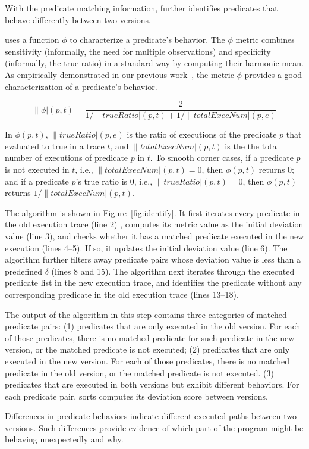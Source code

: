 With the predicate matching information, \ourtool further
identifies predicates that behave differently
between two versions. 

\ourtool uses a function $\phi$ to characterize a predicate's behavior.
The $\phi$ metric combines sensitivity (informally, the need
for multiple observations) and specificity (informally, the
true ratio) in a standard way by computing their harmonic mean.
As empirically demonstrated in our previous work~\cite{Zhang:2013:ADS},
the metric $\phi$ provides a good characterization of a predicate's behavior.

\vspace{-1mm}

{\small{
\[
\|\phi|(p, t) = \frac{2}{{1}/{\|trueRatio|(p, t)} + {1}/{\|totalExecNum|(p, e)}}
\]
}}

\vspace{-1mm}

In $\phi(p, t)$, $\|trueRatio|(p, e)$ is the ratio of executions of the
predicate $p$ that evaluated to true in a trace $t$,
and $\|totalExecNum|(p, t)$ is the the total
number of executions of predicate $p$ in $t$.
To smooth corner cases, if a predicate $p$ is not executed in $t$, 
i.e., $\|totalExecNum|(p, t) = 0$, then $\phi(p, t)$ returns 0;
and if a predicate $p$'s true ratio is 0, i.e., $\|trueRatio|(p, t) = 0$,
then $\phi(p, t)$ returns $1/\|totalExecNum|(p, t)$.

The algorithm is shown in Figure~\ref{fig:identify}.
It first iterates every predicate in the old execution trace (line 2)
, computes its metric value as the initial deviation value (line 3), and
checks whether it has a matched predicate executed in the
new execution (lines 4--5). If so, it updates the
initial deviation value (line 6). The algorithm further filters away
predicate pairs whose deviation value is less than a predefined $\delta$ (lines 8 and 15). The algorithm next iterates through the executed predicate list
in the new execution trace, and identifies the predicate without any
corresponding predicate in the old execution trace (lines 13--18).

The output of the algorithm in this step contains three categories
of matched predicate pairs:
(1) predicates that are only executed in the
old version. For each of those predicates, there is no matched predicate
for such predicate in the new version, or the matched predicate
is not executed; (2) predicates that are only executed
in the new version. For each of those predicates, there is
no matched predicate in the old version, or the matched predicate
is not executed. (3) predicates that
are executed in both versions but exhibit different
behaviors. For each predicate pair, \ourtool sorts computes
its deviation score between versions.


Differences in predicate behaviors indicate different executed paths
between two versions. Such differences provide evidence of
which part of the program might be behaving unexpectedly and why.


